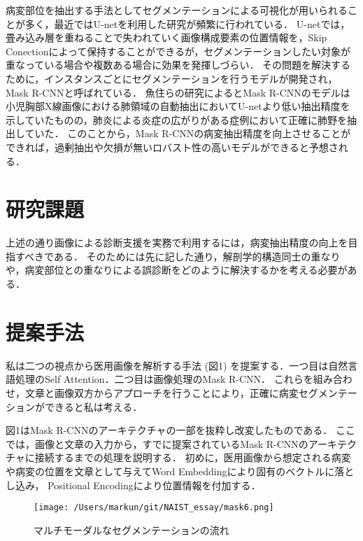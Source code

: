 \documentclass[a4j,10pt,twocolumn]{jarticle}
\begin{document}
病変部位を抽出する手法としてセグメンテーションによる可視化が用いられることが多く，最近ではU-netを利用した研究が頻繁に行われている\cite{近藤堅司2018u}．
U-netでは，畳み込み層を重ねることで失われていく画像構成要素の位置情報を，Skip Conectionによって保持することができるが，セグメンテーションしたい対象が重なっている場合や複数ある場合に効果を発揮しづらい．
その問題を解決するために，インスタンスごとにセグメンテーションを行うモデルが開発され，Mask R-CNNと呼ばれている\cite{he2017mask}．
魚住らの研究によるとMask R-CNNのモデルは小児胸部X線画像における肺領域の自動抽出においてU-netより低い抽出精度を示していたものの，肺炎による炎症の広がりがある症例において正確に肺野を抽出していた\cite{魚住春日2020mask}．
このことから，Mask R-CNNの病変抽出精度を向上させることができれば，過剰抽出や欠損が無いロバスト性の高いモデルができると予想される．

\section{研究課題}
上述の通り画像による診断支援を実務で利用するには，病変抽出精度の向上を目指すべきである．
そのためには先に記した通り，解剖学的構造同士の重なりや，病変部位との重なりによる誤診断をどのように解決するかを考える必要がある．

\section{提案手法}
私は二つの視点から医用画像を解析する手法 (図1) を提案する．一つ目は自然言語処理のSelf Attention\cite{vaswani2017attention}．二つ目は画像処理のMask R-CNN．
これらを組み合わせ，文章と画像双方からアプローチを行うことにより，正確に病変セグメンテーションができると私は考える．

図1はMask R-CNNのアーキテクチャの一部を抜粋し改変したものである．
ここでは，画像と文章の入力から，すでに提案されているMask R-CNNのアーキテクチャに接続するまでの処理を説明する．
初めに，医用画像から想定される病変や病変の位置を文章として与えてWord Embedding\cite{堅山耀太郎2017word}により固有のベクトルに落とし込み， Positional Encodingにより位置情報を付加する．

\begin{figure}[ht]%
    \texttt{[image: /Users/markun/git/NAIST\_essay/mask6.png]}
    \caption{マルチモーダルなセグメンテーションの流れ}
\end{figure}
\end{document}

